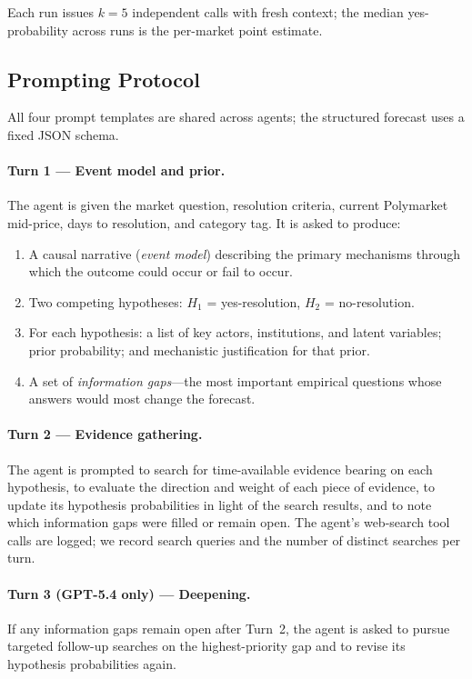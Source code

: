 Each run issues $k = 5$ independent calls with fresh context; the median yes-probability across
runs is the per-market point estimate.

\subsection{Prompting Protocol}
\label{app:prompts}

All four prompt templates are shared across agents; the structured forecast uses a fixed JSON
schema.

\paragraph{Turn 1 --- Event model and prior.}
The agent is given the market question, resolution criteria, current Polymarket mid-price, days
to resolution, and category tag.  It is asked to produce:
\begin{enumerate}
  \item A causal narrative (\textit{event model}) describing the primary mechanisms through
        which the outcome could occur or fail to occur.
  \item Two competing hypotheses: $H_1$ = yes-resolution, $H_2$ = no-resolution.
  \item For each hypothesis: a list of key actors, institutions, and latent variables; prior
        probability; and mechanistic justification for that prior.
  \item A set of \emph{information gaps}---the most important empirical questions whose
        answers would most change the forecast.
\end{enumerate}

\paragraph{Turn 2 --- Evidence gathering.}
The agent is prompted to search for time-available evidence bearing on each hypothesis, to
evaluate the direction and weight of each piece of evidence, to update its hypothesis
probabilities in light of the search results, and to note which information gaps were filled
or remain open.  The agent's web-search tool calls are logged; we record search queries and
the number of distinct searches per turn.

\paragraph{Turn 3 (GPT-5.4 only) --- Deepening.}
If any information gaps remain open after Turn~2, the agent is asked to pursue targeted
follow-up searches on the highest-priority gap and to revise its hypothesis probabilities again.

